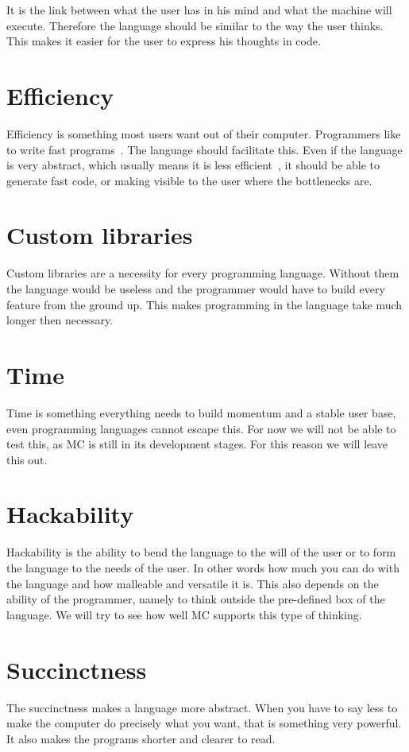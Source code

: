It is the link between what the user has in his mind and what the machine will execute.
Therefore the language should be similar to the way the user thinks.
This makes it easier for the user to express his thoughts in code.

\section{Efficiency}
Efficiency is something most users want out of their computer.
Programmers like to write fast programs~\cite{graham2004hackers,blow2004game}.
The language should facilitate this.
Even if the language is very abstract, which usually means it is less efficient~\cite{graham2004hackers}, it should be able to generate fast code, or making visible to the user where the bottlenecks are.

\section{Custom libraries}
Custom libraries are a necessity for every programming language.
Without them the language would be useless and the programmer would have to build every feature from the ground up.
This makes programming in the language take much longer then necessary.

\section{Time}
Time is something everything needs to build momentum and a stable user base, even programming languages cannot escape this.
For now we will not be able to test this, as MC is still in its development stages.
For this reason we will leave this out.

\section{Hackability}
Hackability is the ability to bend the language to the will of the user or to form the language to the needs of the user.
In other words how much you can do with the language and how malleable and versatile it is.
This also depends on the ability of the programmer, namely to think outside the pre-defined box of the language.
We will try to see how well MC supports this type of thinking.

\section{Succinctness}
The succinctness makes a language more abstract.
When you have to say less to make the computer do precisely what you want, that is something very powerful.
It also makes the programs shorter and clearer to read.

